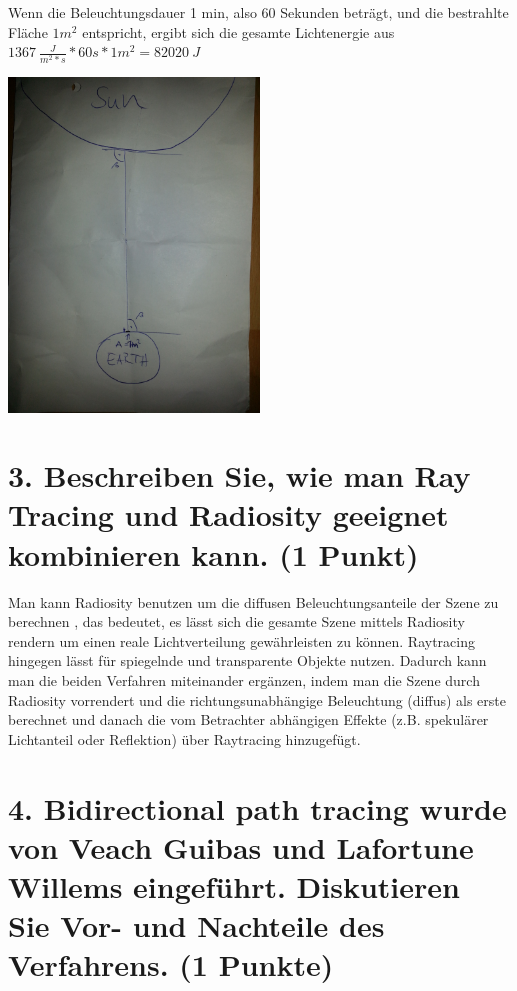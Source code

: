 \documentclass[12pt]{scrreprt}
\begin{document}
Wenn die Beleuchtungsdauer 1 min, also 60 Sekunden beträgt, und die bestrahlte Fläche $1 m^2$ entspricht, ergibt sich die gesamte Lichtenergie aus $1367 ~\frac{J}{m^2 * s} * 60 s * 1 m^2 = 82020~J$

\begin{center}
        \includegraphics[width=0.5\textwidth]{skizze}
\end{center}

\newpage
\section*{3. Beschreiben Sie, wie man Ray Tracing und Radiosity geeignet kombinieren kann. (1 Punkt)}

Man kann Radiosity benutzen um die diffusen Beleuchtungsanteile der Szene zu berechnen , das bedeutet, es lässt sich die gesamte Szene mittels Radiosity rendern um einen reale Lichtverteilung gewährleisten zu können. Raytracing hingegen lässt für spiegelnde und transparente Objekte nutzen. Dadurch kann man die beiden Verfahren miteinander ergänzen, indem man die Szene durch Radiosity vorrendert und die richtungsunabhängige Beleuchtung (diffus) als erste berechnet und danach die vom Betrachter abhängigen Effekte (z.B. spekulärer Lichtanteil oder Reflektion) über Raytracing hinzugefügt.


\section*{4. Bidirectional path tracing wurde von Veach Guibas und Lafortune Willems eingeführt. Diskutieren Sie Vor- und Nachteile des Verfahrens. (1 Punkte)}
\end{document}
